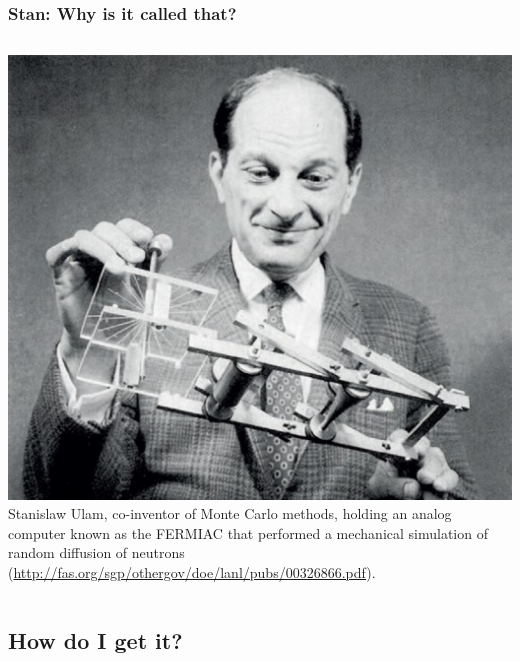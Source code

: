 \documentclass{beamer}
\begin{document}
\begin{frame}
  \frametitle{Stan: Why is it called that?}

\begin{columns}
\includegraphics[width=\textwidth]{graphics/Stanislaw-Ulam-nuclear-scientist.pdf}
 Stanislaw Ulam, co-inventor of Monte Carlo methods, holding an analog computer known as the FERMIAC that performed a mechanical simulation of random diffusion of neutrons (\url{http://fas.org/sgp/othergov/doe/lanl/pubs/00326866.pdf}).
\end{columns}

\end{frame}

\subsection{How do I get it?}
\end{document}
